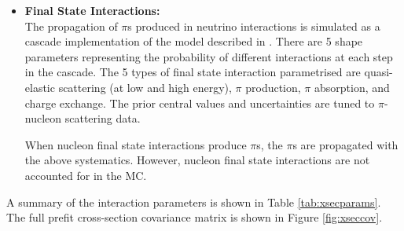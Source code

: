 \begin{itemize}
\item \textbf{Final State Interactions:} \\
The propagation of $\pi$s produced in neutrino interactions is simulated as a cascade implementation of the model described in \cite{fsicascade}. There are 5 shape parameters representing the probability of different interactions at each step in the cascade. The 5 types of final state interaction parametrised are quasi-elastic scattering (at low and high energy), $\pi$ production, $\pi$ absorption, and charge exchange. The prior central values and uncertainties are tuned to $\pi$-nucleon scattering data\cite{fsiscatt}.

When nucleon final state interactions produce $\pi$s, the $\pi$s are propagated with the above systematics. However, nucleon final state interactions are not accounted for in the MC.

\end{itemize}

A summary of the interaction parameters is shown in Table \ref{tab:xsecparams}. The full prefit cross-section covariance matrix is shown in Figure \ref{fig:xseccov}.

